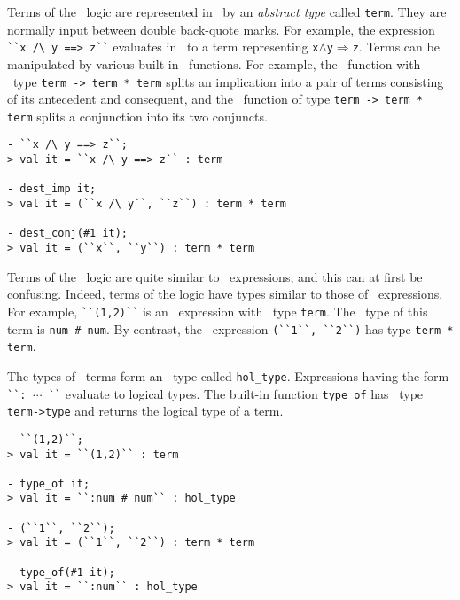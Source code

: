 Terms of the \HOL\ logic are represented in \ML\ by an {\it abstract
  type\/} called {\small\verb|term|}. They are normally input between
double back-quote marks.  For example, the expression
{\small\verb|``x /\ y ==> z``|} evaluates in \ML\ to a term representing
{\small\verb|x|}$\wedge${\small\verb|y|}$\Rightarrow${\small\verb|z|}.
Terms can be manipulated by various built-in \ML\ functions. For
example, the \ML\ function  with \ML\ type
{\small\verb|term -> term * term|} splits an implication into a pair
of terms consisting of its antecedent and consequent, and the \ML\
function  of type {\small\verb|term -> term * term|}
splits a conjunction into its two conjuncts.


\setcounter{sessioncount}{1}
\begin{session}
\begin{verbatim}
- ``x /\ y ==> z``;
> val it = ``x /\ y ==> z`` : term

- dest_imp it;
> val it = (``x /\ y``, ``z``) : term * term

- dest_conj(#1 it);
> val it = (``x``, ``y``) : term * term
\end{verbatim}
\end{session}

Terms of the \HOL\ logic are quite similar to \ML\ expressions, and
this can at first be confusing.  Indeed, terms of the logic have types
similar to those of \ML\ expressions.  For example,
{\small\verb|``(1,2)``|} is an \ML\ expression with \ML\ type
{\small\verb|term|}.  The \HOL\ type of this term is
{\small\verb|num # num|}.  By contrast, the \ML\ expression
{\small\verb|(``1``, ``2``)|} has type {\small\verb|term * term|}.

The types of \HOL\ terms form an \ML\ type called
{\small\verb|hol_type|}.  Expressions having the form
{\small\verb|``: |}$\cdots${\small\verb| ``|} evaluate to logical
types.  The built-in function {\small\verb|type_of|} has \ML\ type
{\small\verb|term->type|} and returns the logical type of a term.

\begin{session}
\begin{verbatim}
- ``(1,2)``;
> val it = ``(1,2)`` : term

- type_of it;
> val it = ``:num # num`` : hol_type

- (``1``, ``2``);
> val it = (``1``, ``2``) : term * term

- type_of(#1 it);
> val it = ``:num`` : hol_type
\end{verbatim}
\end{session}

